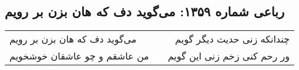 \begin{center}
\section*{رباعی شماره ۱۳۵۹: می‌گوید دف که هان بزن بر رویم}
\label{sec:1359}
\begin{longtable}{l p{0.5cm} r}
می‌گوید دف که هان بزن بر رویم
&&
چندانکه زنی حدیث دیگر گویم
\\
من عاشقم و چو عاشقان خوشخویم
&&
ور رحم کنی زخم زنی این گویم
\\
\end{longtable}
\end{center}
